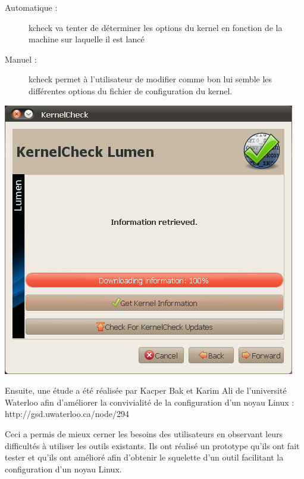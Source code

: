 \documentclass[16pts]{report}
\begin{document}
\begin{description}
    \begin{description}
        \item[Automatique :] kcheck va tenter de déterminer les options du kernel
            en fonction de la machine sur laquelle il est lancé
        \item[Manuel :] kcheck permet à l’utilisateur de modifier comme bon lui
            semble les différentes options du fichier de configuration du kernel.
    \end{description}
        \includegraphics[scale=0.8]{illustrations/KernelCheck.png}\\
\end{description}

Ensuite, une étude a été réalisée par Kacper Bak et Karim Ali de
    l’université Waterloo afin d’améliorer la convivialité de la configuration
    d’un noyau Linux : http://gsd.uwaterloo.ca/node/294

Ceci a permis de mieux cerner les besoins des utilisateurs en observant
    leurs difficultés à utiliser les outils existants. Ils ont réalisé
    un prototype qu’ils ont fait tester et qu’ils ont amélioré afin d’obtenir
    le squelette d’un outil facilitant la configuration d’un noyau Linux. \\
\end{document}

